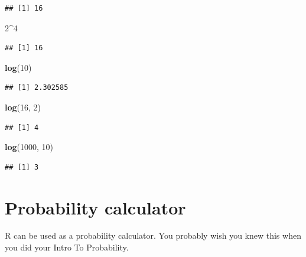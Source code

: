 \documentclass[]{book}
\newenvironment{Shaded}{\begin{snugshade}}{\end{snugshade}}
\newcommand{\KeywordTok}[1]{\textcolor[rgb]{0.13,0.29,0.53}{\textbf{{#1}}}}
\newcommand{\DecValTok}[1]{\textcolor[rgb]{0.00,0.00,0.81}{{#1}}}
\newcommand{\NormalTok}[1]{{#1}}
\theoremstyle{definition}
\theoremstyle{definition}
\theoremstyle{remark}
\begin{document}
\begin{verbatim}
## [1] 16
\end{verbatim}

\begin{Shaded}
\begin{Highlighting}[]
\DecValTok{2}\NormalTok{^}\DecValTok{4}
\end{Highlighting}
\end{Shaded}

\begin{verbatim}
## [1] 16
\end{verbatim}

\begin{Shaded}
\begin{Highlighting}[]
\KeywordTok{log}\NormalTok{(}\DecValTok{10}\NormalTok{)                         }
\end{Highlighting}
\end{Shaded}

\begin{verbatim}
## [1] 2.302585
\end{verbatim}

\begin{Shaded}
\begin{Highlighting}[]
\KeywordTok{log}\NormalTok{(}\DecValTok{16}\NormalTok{, }\DecValTok{2}\NormalTok{)                      }
\end{Highlighting}
\end{Shaded}

\begin{verbatim}
## [1] 4
\end{verbatim}

\begin{Shaded}
\begin{Highlighting}[]
\KeywordTok{log}\NormalTok{(}\DecValTok{1000}\NormalTok{, }\DecValTok{10}\NormalTok{)                   }
\end{Highlighting}
\end{Shaded}

\begin{verbatim}
## [1] 3
\end{verbatim}

\section{Probability calculator}\label{probability-calculator}

R can be used as a probability calculator. You probably wish you knew
this when you did your Intro To Probability.
\end{document}
